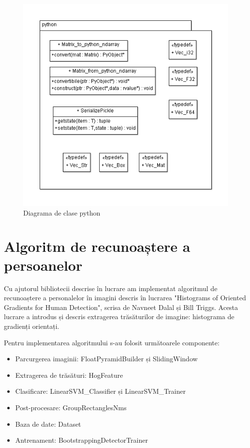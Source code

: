 \begin{figure}[H]
	\centering
		\includegraphics[width=1.00\textwidth]{uml/PythonClassDiagram.png}
	\caption{Diagrama de clase python}
	\label{fig:PythonClassDiagram}
\end{figure}




\pagebreak
\section{Algoritm de recunoaștere a persoanelor}

Cu ajutorul bibliotecii descrise în lucrare am implementat algoritmul de recunoaștere a personalelor în imagini descris în lucrarea "Histograms of Oriented Gradients for Human Detection", scrisa de Navneet Dalal și Bill Triggs\cite{Dalal05histogramsof}.
Acesta lucrare a introdus și descris extragerea trăsăturilor de imagine: histograma de gradienți orientați.

Pentru implementarea algoritmului s-au folosit următoarele componente:
\begin{itemize}
	\item Parcurgerea imaginii: FloatPyramidBuilder și SlidingWindow
	\item Extragerea de trăsături: HogFeature
	\item Clasificare: LinearSVM\_Classifier și LinearSVM\_Trainer
	\item Post-procesare: GroupRectanglesNms
	\item Baza de date: Dataset
	\item Antrenament: BootstrappingDetectorTrainer
\end{itemize}

